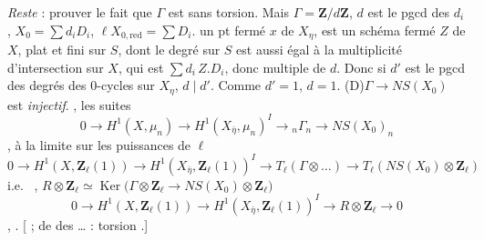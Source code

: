 \documentclass[11pt,a4paper]{article}
\begin{document}
\emph{Reste} : prouver \ill{} le fait que $\Gamma$ est sans torsion. Mais
$\Gamma = \mathbf{Z}/d\mathbf{Z}$, \ill{} $d$ est le pgcd des $d_i$,
$X_0 = \sum d_i D_i$, $\ell X_{0,\mathrm{red}} = \sum D_i$.
 \ill{} \ill{} un pt fermé $x$ de $X_\eta$, \ill{} \ill{}
 est un \ill{} schéma fermé $Z$ de $X$,
plat et fini sur $S$, \struck{\ill{}} dont le degré sur $S$ est aussi égal à la
multiplicité d'intersection  sur $X$, qui est
$\sum d_i\, Z . D_i$, donc multiple de $d$. Donc si \struck{\ill{}} $d'$ est le
pgcd des degrés des $0$-cycles sur $X_\eta$, \ill{} \ill{} $d \mid d'$. Comme
$d' = 1$, \ill{} $d = 1$.
(D)\quad $\Gamma \to NS(X_0)$ est \emph{injectif}.
\struck{\ill{}} \ill{}   \ill{} \ill{}
 \ill{}, \ill{} les suites 
\[
0 \to H^1(X, \mu_n) \to H^1(X_{\bar\eta}, \mu_n)^I \to {}_n\Gamma_n \to
NS(X_0)_n
\]
,  à la limite sur les puissances
\ill{} de $\ell$
\[
0 \to H^1(X, \mathbf{Z}_\ell(1)) \to H^1(X_{\bar\eta}, \mathbf{Z}_\ell(1))^I
\to T_\ell(\Gamma \otimes \ldots) \to T_\ell(NS(X_0) \otimes \mathbf{Z}_\ell)
\]
i.e.\ \ill{} \ill{},  
$R \otimes \mathbf{Z}_\ell \simeq \operatorname{Ker}\bigl(\Gamma \otimes
\mathbf{Z}_\ell \to NS(X_0) \otimes \mathbf{Z}_\ell\bigr)$
\[
0 \to H^1(X, \mathbf{Z}_\ell(1)) \to H^1(X_{\bar\eta}, \mathbf{Z}_\ell(1))^I
\to R \otimes \mathbf{Z}_\ell \to 0
\]
 \ill{} , 
\ill{} \ill{} \ill{}. [\ill{} \ill{}  ; \ill{} \ill{}
\ill{} de  des  \ldots \ill{} : torsion
.]

\end{document}
